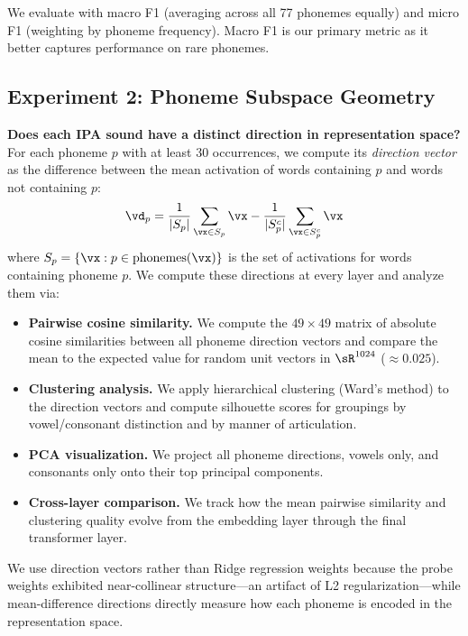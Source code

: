 We evaluate with macro F1 (averaging across all 77 phonemes equally) and micro F1 (weighting by phoneme frequency).
Macro F1 is our primary metric as it better captures performance on rare phonemes.

\subsection{Experiment 2: Phoneme Subspace Geometry}
\label{sec:method_geometry}

{\bf Does each IPA sound have a distinct direction in representation space?}
For each phoneme $p$ with at least 30 occurrences, we compute its \emph{direction vector} as the difference between the mean activation of words containing $p$ and words not containing $p$:
\begin{equation}
    \vd_p = \frac{1}{|S_p|}\sum_{\vx \in S_p} \vx - \frac{1}{|S_p^c|}\sum_{\vx \in S_p^c} \vx
    \label{eq:direction}
\end{equation}
where $S_p = \{\vx : p \in \text{phonemes}(\vx)\}$ is the set of activations for words containing phoneme $p$.
We compute these directions at every layer and analyze them via:

\begin{itemize}[leftmargin=*,itemsep=2pt,topsep=2pt]
    \item \textbf{Pairwise cosine similarity.} We compute the $49 \times 49$ matrix of absolute cosine similarities between all phoneme direction vectors and compare the mean to the expected value for random unit vectors in $\sR^{1024}$ ($\approx 0.025$).
    \item \textbf{Clustering analysis.} We apply hierarchical clustering (Ward's method) to the direction vectors and compute silhouette scores for groupings by vowel/consonant distinction and by manner of articulation.
    \item \textbf{PCA visualization.} We project all phoneme directions, vowels only, and consonants only onto their top principal components.
    \item \textbf{Cross-layer comparison.} We track how the mean pairwise similarity and clustering quality evolve from the embedding layer through the final transformer layer.
\end{itemize}

We use direction vectors rather than Ridge regression weights because the probe weights exhibited near-collinear structure---an artifact of L2 regularization---while mean-difference directions directly measure how each phoneme is encoded in the representation space.

